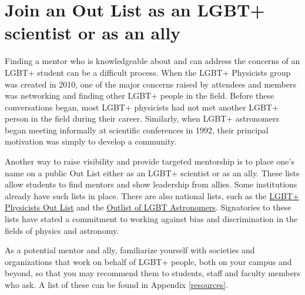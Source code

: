 \section {Join an Out List as an LGBT+ scientist or as an ally}
\label{outlist}
Finding a mentor who is knowledgeable about and can address the concerns of an LGBT+ student can be a difficult process. When the LGBT+ Physicists group was created in 2010, one of the major concerns raised by attendees and members was networking and finding other LGBT+ people in the field. Before these conversations began, most LGBT+ physicists had not met another LGBT+ person in the field during their career.  Similarly, when LGBT+ astronomers began meeting informally at scientific conferences in 1992, their principal motivation was simply to develop a community.

Another way to raise visibility and provide targeted mentorship is to place one's name on a public Out List either as an LGBT+ scientist or as an ally. These lists allow students to find mentors and show leadership from allies. Some institutions already have such lists in place. There are also national lists, such as the \href{http://lgbtphysicists.org/outlist.html}{LGBT+ Physicists Out List} and the \href{http://web.physics.ucsb.edu/~blaes/lgbtastro/}{Outlist of LGBT Astronomers}. Signatories to these lists have stated a commitment to working against bias and discrimination in the fields of physics and astronomy.

As a potential mentor and ally, familiarize yourself with societies and organizations that work on behalf of LGBT+ people, both on your campus and beyond, so that you may recommend them to students, staff and faculty members who ask.  A list of these can be found in Appendix \ref{resources}.

